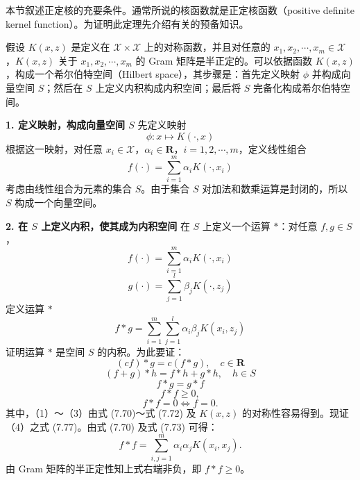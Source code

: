 \documentclass[UTF8,12pt,a4paper,fontset=fandol]{ctexart}
\begin{document}
本节叙述正定核的充要条件。通常所说的核函数就是正定核函数（positive definite kernel function）。为证明此定理先介绍有关的预备知识。

假设 $K(x,z)$ 是定义在 $\mathcal{X}\times\mathcal{X}$ 上的对称函数，并且对任意的 $x_1,x_2,\cdots,x_m\in\mathcal{X}$，$K(x,z)$ 关于 $x_1,x_2,\cdots,x_m$ 的 Gram 矩阵是半正定的。可以依据函数 $K(x,z)$，构成一个希尔伯特空间（Hilbert space），其步骤是：首先定义映射 $\phi$ 并构成向量空间 $S$；然后在 $S$ 上定义内积构成内积空间；最后将 $S$ 完备化构成希尔伯特空间。

\noindent\textbf{1. 定义映射，构成向量空间 $S$}\quad
先定义映射
\begin{equation}
\phi:x\mapsto K(\cdot,x)
\tag{7.69}
\end{equation}
根据这一映射，对任意 $x_i\in\mathcal{X}$，$\alpha_i\in\mathbf{R}$，$i=1,2,\cdots,m$，定义线性组合
\begin{equation}
f(\cdot)=\sum_{i=1}^m\alpha_iK(\cdot,x_i)
\tag{7.70}
\end{equation}
考虑由线性组合为元素的集合 $S$。由于集合 $S$ 对加法和数乘运算是封闭的，所以 $S$ 构成一个向量空间。

\noindent\textbf{2. 在 $S$ 上定义内积，使其成为内积空间}\quad
在 $S$ 上定义一个运算 $*$：对任意 $f,g\in S$，
\begin{equation}
f(\cdot)=\sum_{i=1}^m\alpha_iK(\cdot,x_i)
\tag{7.71}
\end{equation}
\begin{equation}
g(\cdot)=\sum_{j=1}^l\beta_jK(\cdot,z_j)
\tag{7.72}
\end{equation}
定义运算 $*$
\begin{equation}
f*g=\sum_{i=1}^m\sum_{j=1}^l\alpha_i\beta_jK(x_i,z_j)
\tag{7.73}
\end{equation}
证明运算 $*$ 是空间 $S$ 的内积。为此要证：
\begin{equation}
(cf)*g=c(f*g),\quad c\in\mathbf{R}
\tag{7.74}
\end{equation}
\begin{equation}
(f+g)*h=f*h+g*h,\quad h\in S
\tag{7.75}
\end{equation}
\begin{equation}
f*g=g*f
\tag{7.76}
\end{equation}
\begin{equation}
f*f\geq 0,
\tag{7.77}
\end{equation}
\begin{equation}
f*f=0\Leftrightarrow f=0.
\tag{7.78}
\end{equation}
其中，（1）～（3）由式 (7.70)～式 (7.72) 及 $K(x,z)$ 的对称性容易得到。现证（4）之式 (7.77)。由式 (7.70) 及式 (7.73) 可得：
\[
f*f=\sum_{i,j=1}^m\alpha_i\alpha_jK(x_i,x_j).
\]
由 Gram 矩阵的半正定性知上式右端非负，即 $f*f\geq 0$。
\end{document}
